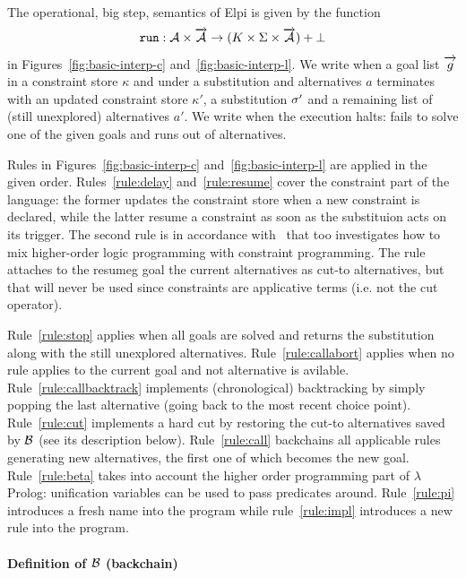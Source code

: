 \documentclass[a4paper, 11pt]{book}
\begin{document}
The operational, big step, semantics of Elpi is given by the function
$$
\run{} : \alt \times \vecL{\alt} \to (K  \times \Sigma \times \vecL{\alt}) + \bot
$$
in Figures~\cref{fig:basic-interp-c} and~\cref{fig:basic-interp-l}.
We write 
when a goal list $\vecL{g}$ in a constraint store $\kappa$ and under a substitution \subst and alternatives $a$
terminates with an updated constraint store $\kappa'$, a substitution $\sigma'$ and a remaining list of
(still unexplored) alternatives $a'$. We write  
when the execution halts: fails to solve one of the given goals and runs out of
alternatives. 

Rules in Figures~\cref{fig:basic-interp-c} and~\cref{fig:basic-interp-l}
are applied in the given order. Rules~\cref{rule:delay} and~\cref{rule:resume}
cover the constraint part of the language: the former updates the constraint
store when a new constraint is declared, while the latter resume a constraint
as soon as the substituion \subst acts on its trigger. The second rule
is in accordance with~\cite{Michaylov1993HigherOrderLP} that too investigates
how to mix higher-order logic programming with constraint programming.
The rule attaches to the resumeg goal the current alternatives as cut-to
alternatives, but that will never be used since constraints are applicative
terms (i.e. not the cut operator).

Rule~\cref{rule:stop} applies when all goals are solved and returns
the substitution along with the still unexplored alternatives.
Rule~\cref{rule:callabort} applies when no rule applies to the
current goal and not alternative is avilable.
Rule~\cref{rule:callbacktrack} implements (chronological) backtracking by simply
popping the last alternative (going back to the most recent choice point).
Rule~\cref{rule:cut} implements a hard cut by restoring the cut-to alternatives
saved by $\mathcal{B}$ (see its description below).
Rule~\cref{rule:call} backchains all applicable rules generating new
alternatives, the first one of which becomes the new goal.
Rule~\cref{rule:beta} takes into account the higher order programming part
of $\lambda$Prolog: unification variables can be used to pass
predicates around.
Rule~\cref{rule:pi} introduces a fresh name into the program
while rule~\cref{rule:impl} introduces a new rule into the program.

\paragraph{Definition of $\mathcal{B}$ (backchain)}
\end{document}
